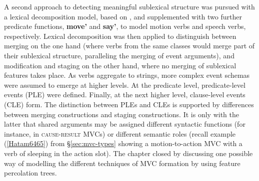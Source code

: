 A second approach to detecting meaningful sublexical structure was pursued with a lexical decomposition model, based on \citet{van1997syntax}, and supplemented with two further predicate functions, \textbf{move'} and \textbf{say'}, to model motion verbs and speech verbs, respectively. Lexical decomposition was then applied to distinguish between merging on the one hand (where verbs from the same classes would merge part of their sublexical structure, paralleling the merging of event arguments), and modification and staging on the other hand, where no merging of sublexical features takes place. As verbs aggregate to strings, more complex event schemas were assumed to emerge at higher levels. At the predicate level, predicate-level events (PLE) were defined. Finally, at the next higher level, clause-level events (CLE) form. The distinction between PLEs and CLEs is supported by differences between merging constructions and staging constructions. It is only with the latter that shared arguments may be assigned different syntactic functions (for instance, in \textsc{cause-result} MVCs) or different semantic roles (recall example (\ref{Hatam6465}) from §\ref{sec:mvc-types} showing a motion-to-action MVC with a verb of sleeping in the action slot). The chapter closed by discussing one possible way of modelling the different techniques of MVC formation by using feature percolation trees.

